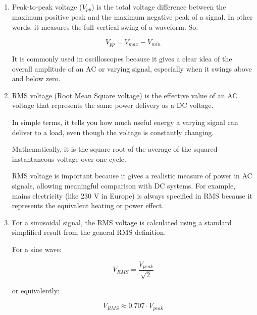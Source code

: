 \documentclass[../main.tex]{subfiles}
\begin{document}
\begin{enumerate}[label=\textbf{\arabic*.}]
	Then the via the oscilloscope (or manual calculation) gives:
	
	\begin{equation}
		\unit{Duty\;cycle} = \frac{t_{H}}{T_{P}} \cdot 100\%
	\end{equation}
	
	
	\item Peak-to-peak voltage ($V_{pp}$) is the total voltage difference between the maximum positive peak and the maximum negative peak of a signal.
	In other words, it measures the full vertical swing of a waveform.
	So:
	
	\begin{equation}
		V_{pp} = V_{max} - V_{min}
	\end{equation}

	It is commonly used in oscilloscopes because it gives a clear idea of the overall amplitude of an AC or varying signal, especially when it swings above and below zero.
	
	\item RMS voltage (Root Mean Square voltage) is the effective value of an AC voltage that represents the same power delivery as a DC voltage.

	In simple terms, it tells you how much useful energy a varying signal can deliver to a load, even though the voltage is constantly changing.

	Mathematically, it is the square root of the average of the squared instantaneous voltage over one cycle.

	RMS voltage is important because it gives a realistic measure of power in AC signals, allowing meaningful comparison with DC systems. For example, mains electricity (like 230 V in Europe) is always specified in RMS because it represents the equivalent heating or power effect.

	\item For a sinusoidal signal, the RMS voltage is calculated using a standard simplified result from the general RMS definition.

	For a sine wave:
	
	\begin{equation}
		V_{RMS} = \frac{V_{peak}}{\sqrt{2}}
	\end{equation}


	or equivalently:
	
	\begin{equation}
		V_{RMS} \approx 0.707 \cdot V_{peak}
	\end{equation}


\end{enumerate}
\end{document}
